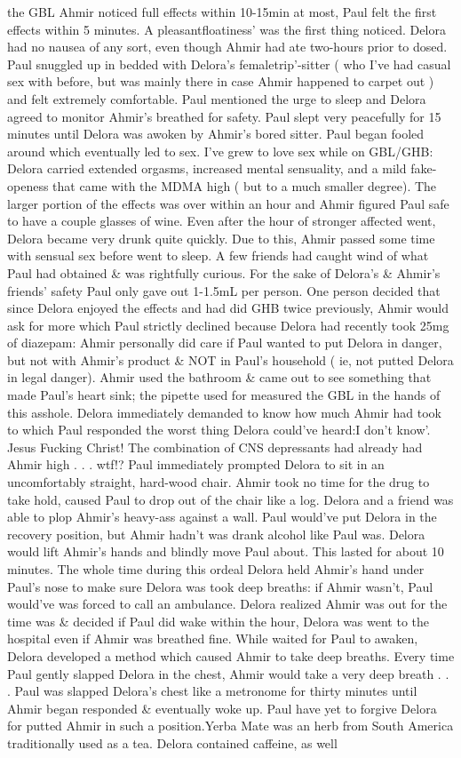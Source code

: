 \documentclass[12pt]{book}
\begin{document}
the GBL Ahmir noticed full effects within 10-15min at most, Paul felt the first effects within 5 minutes. A pleasantfloatiness' was the first thing noticed. Delora had no nausea of any sort, even though Ahmir had ate two-hours prior to dosed. Paul snuggled up in bedded with Delora's femaletrip'-sitter ( who I've had casual sex with before, but was mainly there in case Ahmir happened to carpet out ) and felt extremely comfortable. Paul mentioned the urge to sleep and Delora agreed to monitor Ahmir's breathed for safety. Paul slept very peacefully for 15 minutes until Delora was awoken by Ahmir's bored sitter. Paul began fooled around which eventually led to sex. I've grew to love sex while on GBL/GHB: Delora carried extended orgasms, increased mental sensuality, and a mild fake-openess that came with the MDMA high ( but to a much smaller degree). The larger portion of the effects was over within an hour and Ahmir figured Paul safe to have a couple glasses of wine. Even after the hour of stronger affected went, Delora became very drunk quite quickly. Due to this, Ahmir passed some time with sensual sex before went to sleep. A few friends had caught wind of what Paul had obtained \& was rightfully curious. For the sake of Delora's \& Ahmir's friends' safety Paul only gave out 1-1.5mL per person. One person decided that since Delora enjoyed the effects and had did GHB twice previously, Ahmir would ask for more which Paul strictly declined because Delora had recently took 25mg of diazepam: Ahmir personally did care if Paul wanted to put Delora in danger, but not with Ahmir's product \& NOT in Paul's household ( ie, not putted Delora in legal danger). Ahmir used the bathroom \& came out to see something that made Paul's heart sink; the pipette used for measured the GBL in the hands of this asshole. Delora immediately demanded to know how much Ahmir had took to which Paul responded the worst thing Delora could've heard:I don't know'. Jesus Fucking Christ! The combination of CNS depressants had already had Ahmir high . . .  wtf!? Paul immediately prompted Delora to sit in an uncomfortably straight, hard-wood chair. Ahmir took no time for the drug to take hold, caused Paul to drop out of the chair like a log. Delora and a friend was able to plop Ahmir's heavy-ass against a wall. Paul would've put Delora in the recovery position, but Ahmir hadn't was drank alcohol like Paul was. Delora would lift Ahmir's hands and blindly move Paul about. This lasted for about 10 minutes. The whole time during this ordeal Delora held Ahmir's hand under Paul's nose to make sure Delora was took deep breaths: if Ahmir wasn't, Paul would've was forced to call an ambulance. Delora realized Ahmir was out for the time was \& decided if Paul did wake within the hour, Delora was went to the hospital even if Ahmir was breathed fine. While waited for Paul to awaken, Delora developed a method which caused Ahmir to take deep breaths. Every time Paul gently slapped Delora in the chest, Ahmir would take a very deep breath . . .  Paul was slapped Delora's chest like a metronome for thirty minutes until Ahmir began responded \& eventually woke up. Paul have yet to forgive Delora for putted Ahmir in such a position.Yerba Mate was an herb from South America traditionally used as a tea. Delora contained caffeine, as well 
\end{document}
